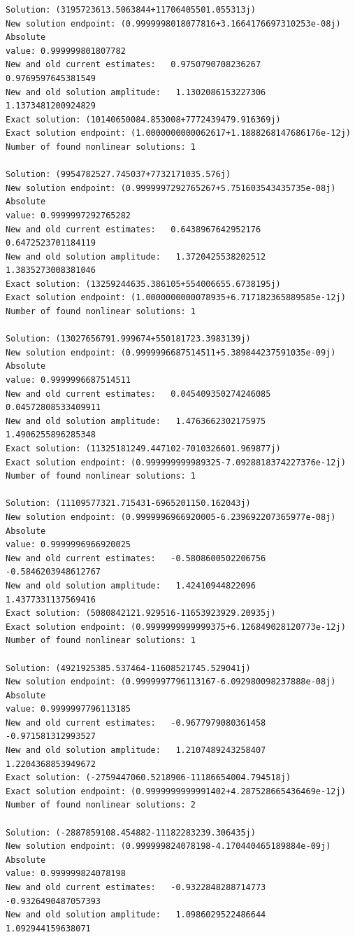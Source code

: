 \documentclass[11pt]{article}
\begin{document}
\begin{Verbatim}[commandchars=\\\{\}]
Solution: (3195723613.5063844+11706405501.055313j)
New solution endpoint: (0.9999998018077816+3.1664176697310253e-08j) Absolute
value: 0.999999801807782
New and old current estimates:   0.9750790708236267    0.9769597645381549
New and old solution amplitude:   1.1302086153227306    1.1373481200924829
Exact solution: (10140650084.853008+7772439479.916369j)
Exact solution endpoint: (1.0000000000062617+1.1888268147686176e-12j)
Number of found nonlinear solutions: 1

Solution: (9954782527.745037+7732171035.576j)
New solution endpoint: (0.9999997292765267+5.751603543435735e-08j) Absolute
value: 0.9999997292765282
New and old current estimates:   0.6438967642952176    0.6472523701184119
New and old solution amplitude:   1.3720425538202512    1.3835273008381046
Exact solution: (13259244635.386105+554006655.6738195j)
Exact solution endpoint: (1.0000000000078935+6.717182365889585e-12j)
Number of found nonlinear solutions: 1

Solution: (13027656791.999674+550181723.3983139j)
New solution endpoint: (0.9999996687514511+5.389844237591035e-09j) Absolute
value: 0.9999996687514511
New and old current estimates:   0.045409350274246085    0.04572808533409911
New and old solution amplitude:   1.4763662302175975    1.4906255896285348
Exact solution: (11325181249.447102-7010326601.969877j)
Exact solution endpoint: (0.999999999989325-7.0928818374227376e-12j)
Number of found nonlinear solutions: 1

Solution: (11109577321.715431-6965201150.162043j)
New solution endpoint: (0.9999996966920005-6.239692207365977e-08j) Absolute
value: 0.9999996966920025
New and old current estimates:   -0.5808600502206756    -0.5846203948612767
New and old solution amplitude:   1.42410944822096    1.4377331137569416
Exact solution: (5080842121.929516-11653923929.20935j)
Exact solution endpoint: (0.9999999999999375+6.126849028120773e-12j)
Number of found nonlinear solutions: 1

Solution: (4921925385.537464-11608521745.529041j)
New solution endpoint: (0.9999997796113167-6.092980098237888e-08j) Absolute
value: 0.9999997796113185
New and old current estimates:   -0.9677979080361458    -0.971581312993527
New and old solution amplitude:   1.2107489243258407    1.2204368853949672
Exact solution: (-2759447060.5218906-11186654004.794518j)
Exact solution endpoint: (0.9999999999991402+4.287528665436469e-12j)
Number of found nonlinear solutions: 2

Solution: (-2887859108.454882-11182283239.306435j)
New solution endpoint: (0.999999824078198-4.170440465189884e-09j) Absolute
value: 0.999999824078198
New and old current estimates:   -0.9322848288714773    -0.9326490487057393
New and old solution amplitude:   1.0986029522486644    1.092944159638071


\end{Verbatim}
\end{document}
